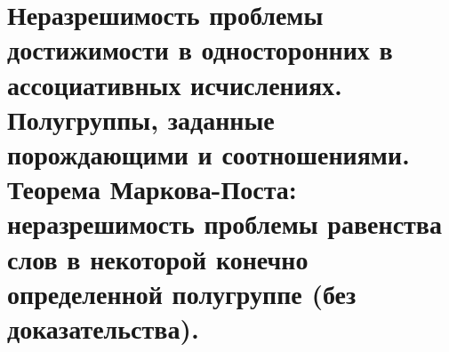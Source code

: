 \section{Неразрешимость проблемы достижимости в односторонних в ассоциативных исчислениях. Полугруппы, заданные порождающими и соотношениями. Теорема Маркова-Поста: неразрешимость проблемы равенства слов в некоторой конечно определенной полугруппе (без доказательства).}